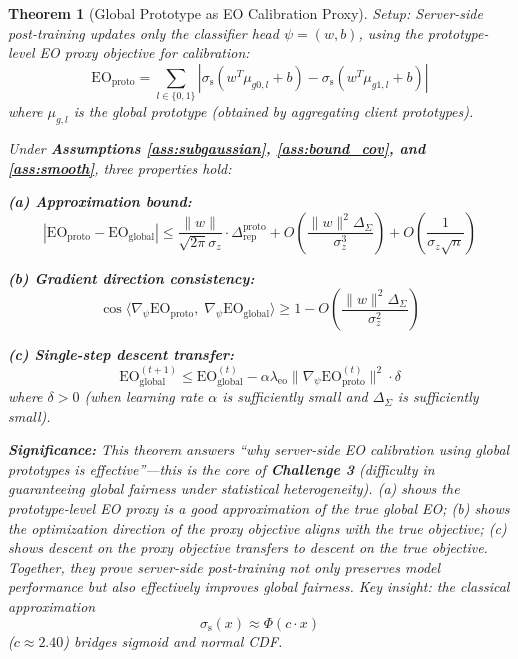 \documentclass[11pt]{article}
\newtheorem{theorem}{Theorem}
\begin{document}
\begin{theorem}[Global Prototype as EO Calibration Proxy]
\label{thm:server_eo}
\textit{Setup}: Server-side post-training updates only the classifier head $\psi = (w, b)$, using the prototype-level EO proxy objective for calibration:
$$\mathrm{EO}_{\mathrm{proto}} = \sum_{l \in \{0,1\}} \left| \sigma_{\text{s}}(w^T \mu_{g0,l} + b) - \sigma_{\text{s}}(w^T \mu_{g1,l} + b) \right|$$
where $\mu_{g,l}$ is the global prototype (obtained by aggregating client prototypes).

Under \textbf{Assumptions \ref{ass:subgaussian}, \ref{ass:bound_cov}, and \ref{ass:smooth}}, three properties hold:

\textbf{(a) Approximation bound:}
$$|\mathrm{EO}_{\mathrm{proto}} - \mathrm{EO}_{\mathrm{global}}| \leq \frac{\|w\|}{\sqrt{2\pi}\sigma_z} \cdot \Delta_{\mathrm{rep}}^{\mathrm{proto}} + O\left(\frac{\|w\|^2 \Delta_{\Sigma}}{\sigma_z^3}\right) + O\left(\frac{1}{\sigma_z\sqrt{n}}\right)$$

\textbf{(b) Gradient direction consistency:}
$$\cos\langle \nabla_\psi \mathrm{EO}_{\mathrm{proto}},\; \nabla_\psi \mathrm{EO}_{\mathrm{global}} \rangle \geq 1 - O\left(\frac{\|w\|^2 \Delta_{\Sigma}}{\sigma_z^2}\right)$$

\textbf{(c) Single-step descent transfer:}
$$\mathrm{EO}_{\mathrm{global}}^{(t+1)} \leq \mathrm{EO}_{\mathrm{global}}^{(t)} - \alpha \lambda_{\mathrm{eo}} \|\nabla_\psi \mathrm{EO}_{\mathrm{proto}}^{(t)}\|^2 \cdot \delta$$
where $\delta > 0$ (when learning rate $\alpha$ is sufficiently small and $\Delta_\Sigma$ is sufficiently small).

\textbf{Significance:} This theorem answers ``why server-side EO calibration using global prototypes is effective''---this is the core of \textbf{Challenge 3} (difficulty in guaranteeing global fairness under statistical heterogeneity). (a) shows the prototype-level EO proxy is a good approximation of the true global EO; (b) shows the optimization direction of the proxy objective aligns with the true objective; (c) shows descent on the proxy objective transfers to descent on the true objective. Together, they prove server-side post-training not only preserves model performance but also effectively improves global fairness. Key insight: the classical approximation $$\sigma_{\text{s}}(x) \approx \Phi(c \cdot x)$$ ($c \approx 2.40$) bridges sigmoid and normal CDF.
\end{theorem}
\end{document}
